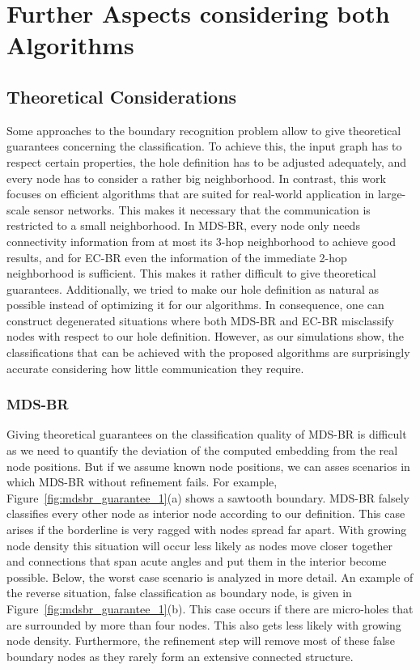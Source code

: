 \documentclass{llncs}
\begin{document}
\section{Further Aspects considering both Algorithms}

\subsection{Theoretical Considerations}
Some approaches to the boundary recognition problem allow to give theoretical guarantees concerning the classification.
To achieve this, the input graph has to respect certain properties, the hole definition has to be adjusted adequately, and every node has to consider a rather big neighborhood. 
In contrast, this work focuses on efficient algorithms that are suited for real-world application in large-scale sensor networks.
This makes it necessary that the communication is restricted to a small neighborhood.
In MDS-BR, every node only needs connectivity information from at most its 3-hop neighborhood to achieve good results, and for EC-BR even the information of the immediate 2-hop neighborhood is sufficient.
This makes it rather difficult to give theoretical guarantees.
Additionally, we tried to make our hole definition as natural as possible instead of optimizing it for our algorithms.
In consequence, one can construct degenerated situations where both MDS-BR and EC-BR misclassify nodes with respect to our hole definition.
However, as our simulations show, the classifications that can be achieved with the proposed algorithms are surprisingly accurate considering how little communication they require.

\subsubsection{MDS-BR}
Giving theoretical guarantees on the classification quality of MDS-BR is difficult as we need to quantify the deviation of the computed embedding from the real node positions.
But if we assume known node positions, we can asses scenarios in which MDS-BR without refinement fails.
For example, Figure~\ref{fig:mdsbr_guarantee_1}(a) shows a sawtooth boundary.
MDS-BR falsely classifies every other node as interior node according to our definition.
This case arises if the borderline is very ragged with nodes spread far apart.
With growing node density this situation will occur less likely as nodes move closer together and connections that span acute angles and put them in the interior  become possible.
Below, the worst case scenario is analyzed in more detail.
An example of the reverse situation, false classification as boundary node, is given in Figure~\ref{fig:mdsbr_guarantee_1}(b).
This case occurs if there are micro-holes that are surrounded by more than four nodes.
This also gets less likely with growing node density.
Furthermore, the refinement step will remove most of these false boundary nodes as they rarely form an extensive connected structure.
\end{document}
